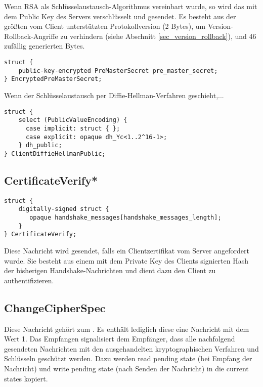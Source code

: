 Wenn RSA als Schlüsselaustausch-Algorithmus vereinbart wurde, so wird das \premastersecret{} mit dem Public Key des Servers verschlüsselt und gesendet. Es besteht aus der größten vom Client unterstützten Protokollversion (2 Bytes), um Version-Rollback-Angriffe zu verhindern (siehe Abschnitt \ref{sec_version_rollback}), und 46 zufällig generierten Bytes.

\begin{lstlisting}
struct {
	public-key-encrypted PreMasterSecret pre_master_secret;
} EncryptedPreMasterSecret;
\end{lstlisting}

Wenn der Schlüsselaustausch per Diffie-Hellman-Verfahren geschieht,...

\begin{lstlisting}
struct {
	select (PublicValueEncoding) {
	  case implicit: struct { };
	  case explicit: opaque dh_Yc<1..2^16-1>;
	} dh_public;
} ClientDiffieHellmanPublic;
\end{lstlisting}

\subsection*{CertificateVerify*}

\begin{lstlisting}
struct {
	digitally-signed struct {
	   opaque handshake_messages[handshake_messages_length];
	}
} CertificateVerify;
\end{lstlisting}

Diese Nachricht wird gesendet, falls ein Clientzertifikat vom Server angefordert wurde. Sie besteht aus einem mit dem Private Key des Clients signierten Hash der bisherigen Handshake-Nachrichten und dient dazu den Client zu authentifizieren.

\subsection*{ChangeCipherSpec}

Diese Nachricht gehört zum \changecipherspecprotocol{}. Es enthält lediglich diese eine Nachricht mit dem Wert 1. Das Empfangen signalisiert dem Empfänger, dass alle nachfolgend gesendeten Nachrichten mit den ausgehandelten kryptographischen Verfahren und Schlüsseln geschützt werden. Dazu werden read pending state (bei Empfang der Nachricht) und write pending state (nach Senden der Nachricht) in die current states kopiert.

